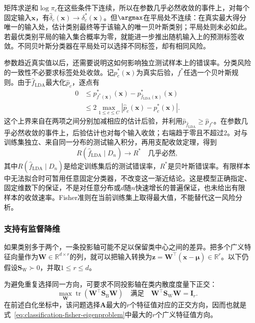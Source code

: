 矩阵求逆和$\log\pi_c$在这些条件下连续，所以在参数几乎必然收敛的事件上，对每个固定输入$\bm{x}$，有$\hat\delta_c(\bm{x})\to\delta_c^\ast(\bm{x})$。但$\argmax$在平局处不连续：在真实最大得分唯一的输入处，估计类别最终等于该输入的唯一贝叶斯类别；平局处则未必如此。若最优类别平局的输入集合概率为零，就能进一步推出随机输入上的预测标签收敛。不同贝叶斯分类器在平局处可以选择不同标签，却有相同风险。

参数趋近真实值以后，还需要说明这如何影响独立测试样本上的错误率。分类风险的一致性不必要求标签处处收敛。记$p_c^\ast(\bm{x})$为真实后验，$f^\ast$任选一个贝叶斯规则。由于$\hat f_{\mathrm{LDA}}$最大化$\hat p_c$，逐点有
\begin{equation}
  \label{eq:classification-lda-excess-risk}
  \begin{aligned}
    0&\leq p_{f^\ast(\bm{x})}^\ast(\bm{x})
      -p_{\hat f_{\mathrm{LDA}}(\bm{x})}^\ast(\bm{x})\\
      &\leq 2\max_{1\leq c\leq C}
          |\hat p_c(\bm{x})-p_c^\ast(\bm{x})| .
  \end{aligned}
\end{equation}
这个上界来自在两项之间分别加减相应的估计后验，并利用$\hat p_{\hat f_{\mathrm{LDA}}}\geq\hat p_{f^\ast}$。在参数几乎必然收敛的事件上，后验估计也对每个输入收敛；右端趋于零且不超过$2$。对与训练集独立、来自同一分布的测试输入积分，再用支配收敛定理，得到
\[
  R(\hat f_{\mathrm{LDA}}\mid D_n)
    \longrightarrow R^\ast
    \quad\text{几乎必然},
\]
其中$R(\hat f_{\mathrm{LDA}}\mid D_n)$是给定训练集后的测试错误率，$R^\ast$是贝叶斯错误率。有限样本中无法拟合时可暂用任意固定分类器，不改变这一渐近结论。这是模型正确指定、固定维数下的保证，不是对任意分布或$d$随$n$快速增长的普遍保证，也未给出有限样本的收敛速率。Fisher准则在当前训练集上取得最大值，不能替代这一风险分析。

\subsubsection{支持有监督降维}
\label{sec:classification-lda-reduction}

如果类别多于两个，一条投影轴可能不足以保留类中心之间的差异。把多个广义特征向量作为$\bm{W}\in\mathbb{R}^{d\times r}$的列，就可以把输入转换为$\bm{z}=\bm{W}^{\top}(\bm{x}-\hat{\bm{\mu}})\in\mathbb{R}^{r}$。以下仍假设$\bm{S}_{\mathrm{W}}\succ0$，并取$1\leq r\leq d$。

为避免重复选择同一方向，可要求不同投影轴在类内散度度量下正交：
\begin{equation}
  \label{eq:classification-lda-subspace}
  \max_{\bm{W}}\operatorname{tr}
       (\bm{W}^{\top}\bm{S}_{\mathrm{B}}\bm{W})
  \quad\text{满足}\quad
  \bm{W}^{\top}\bm{S}_{\mathrm{W}}\bm{W}=\bm{I}_r .
\end{equation}
在前述白化坐标中，该问题选择$\bm{A}$最大的$r$个特征值对应的正交方向，因而也就是式~\eqref{eq:classification-fisher-eigenproblem}中最大的$r$个广义特征值方向。

